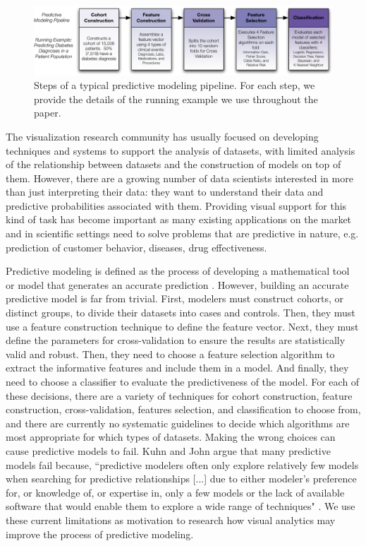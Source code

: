 \begin{figure}[ht]
\centering
\includegraphics[width=\linewidth]{infuse/pipeline}
\caption[Steps of a typical predictive modeling pipeline.]{Steps of a typical predictive modeling pipeline.  For each step, we provide the details of the running example we use throughout the paper.
}
\label{fig:pipeline}
\end{figure}

The visualization research community has usually focused on developing techniques and systems to support the analysis of datasets, with limited analysis of the relationship between datasets and the construction of models on top of them. However, there are a growing number of data scientists interested in more than just interpreting their data: they want to understand their data and predictive probabilities associated with them. Providing visual support for this kind of task has become important as many existing applications on the market and in scientific settings need to solve problems that are predictive in nature, e.g. prediction of customer behavior, diseases, drug effectiveness.

Predictive modeling is defined as the process of developing a mathematical tool or model that generates an accurate prediction \cite{kuhn2013applied}. However, building an accurate predictive model is far from trivial. First, modelers must construct cohorts, or distinct groups, to divide their datasets into cases and controls. Then, they must use a feature construction technique to define the feature vector. Next, they must define the parameters for cross-validation to ensure the results are statistically valid and robust. Then, they need to choose a feature selection algorithm to extract the informative features and include them in a model. And finally, they need to choose a classifier to evaluate the predictiveness of the model. For each of these decisions, there are a variety of techniques for cohort construction, feature construction, cross-validation, features selection, and classification to choose from, and there are currently no systematic guidelines to decide which algorithms are most appropriate for which types of datasets. Making the wrong choices can cause predictive models to fail. Kuhn and John argue that many predictive models fail because, ``predictive modelers often only explore relatively few models when searching for predictive relationships [...] due to either modeler's preference for, or knowledge of, or expertise in, only a few models or the lack of available software that would enable them to explore a wide range of techniques" \cite{kuhn2013applied}. We use these current limitations as motivation to research how visual analytics may improve the process of predictive modeling.

